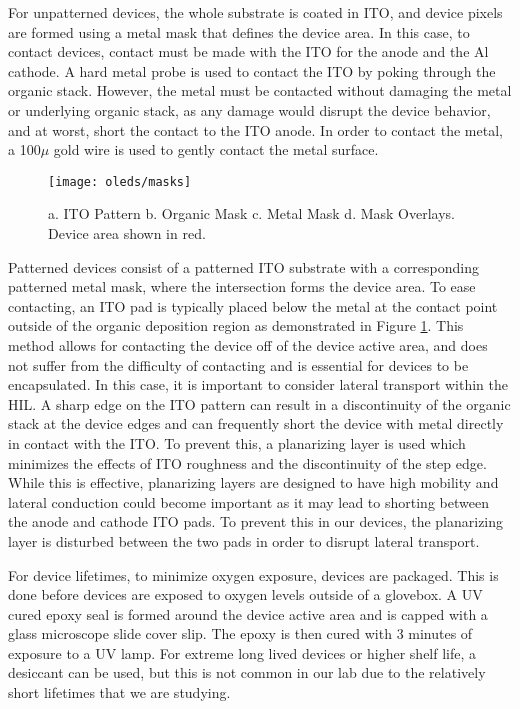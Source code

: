 \documentclass[../thesis.tex]{subfiles}
\begin{document}
For unpatterned devices, the whole substrate is coated in ITO, and device pixels are formed using a metal mask that defines the device area.
In this case, to contact devices, contact must be made with the ITO for the anode and the Al cathode.
A hard metal probe is used to contact the ITO by poking through the organic stack.
However, the metal must be contacted without damaging the metal or underlying organic stack, as any damage would disrupt the device behavior, and at worst, short the contact to the ITO anode.
In order to contact the metal, a 100$\mu$ gold wire is used to gently contact the metal surface.

\begin{figure}[ht]
    \centering
    \texttt{[image: oleds/masks]}
    \caption{a. ITO Pattern b. Organic Mask c. Metal Mask d. Mask Overlays.  Device area shown in red.}
    \label{fig:oleds_masking}\par\vfill
\end{figure}

Patterned devices consist of a patterned ITO substrate with a corresponding patterned metal mask, where the intersection forms the device area.
To ease contacting, an ITO pad is typically placed below the metal at the contact point outside of the organic deposition region as demonstrated in Figure \ref{fig:oleds_masking}.
This method allows for contacting the device off of the device active area, and does not suffer from the difficulty of contacting and is essential for devices to be encapsulated.
In this case, it is important to consider lateral transport within the HIL.
A sharp edge on the ITO pattern can result in a discontinuity of the organic stack at the device edges and can frequently short the device with metal directly in contact with the ITO.
To prevent this, a planarizing layer is used which minimizes the effects of ITO roughness and the discontinuity of the step edge.
While this is effective, planarizing layers are designed to have high mobility and lateral conduction could become important as it may lead to shorting between the anode and cathode ITO pads.
To prevent this in our devices, the planarizing layer is disturbed between the two pads in order to disrupt lateral transport.

For device lifetimes, to minimize oxygen exposure, devices are packaged.
This is done before devices are exposed to oxygen levels outside of a glovebox.
A UV cured epoxy seal is formed around the device active area and is capped with a glass microscope slide cover slip.
The epoxy is then cured with 3 minutes of exposure to a UV lamp.
For extreme long lived devices or higher shelf life, a desiccant can be used, but this is not common in our lab due to the relatively short lifetimes that we are studying.
\end{document}
